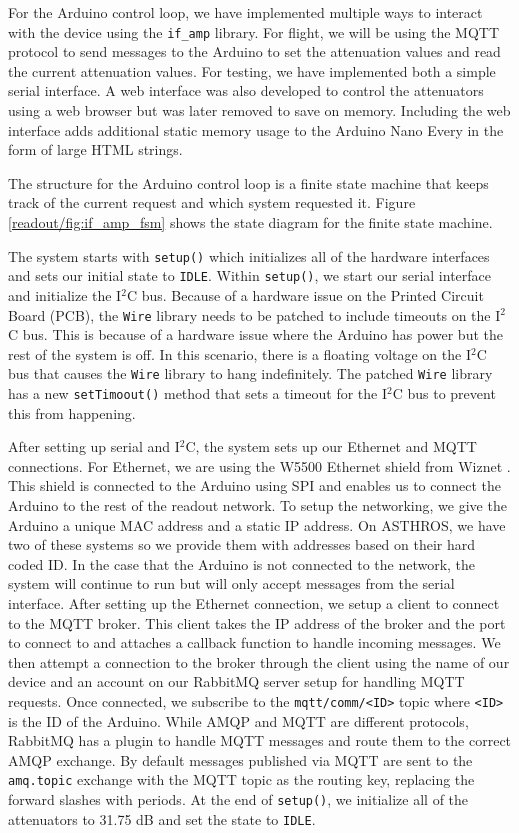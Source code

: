 For the Arduino control loop, we have implemented multiple ways to interact with the device using the \texttt{if\_amp} library.
For flight, we will be using the MQTT protocol to send messages to the Arduino to set the attenuation values and read the current attenuation values.
For testing, we have implemented both a simple serial interface. 
A web interface was also developed to control the attenuators using a web browser but was later removed to save on memory. 
Including the web interface adds additional static memory usage to the Arduino Nano Every in the form of large HTML strings.

The structure for the Arduino control loop is a finite state machine that keeps track of the current request and which system requested it.
Figure \ref{readout/fig:if_amp_fsm} shows the state diagram for the finite state machine.

The system starts with \texttt{setup()} which initializes all of the hardware interfaces and sets our initial state to \texttt{IDLE}.
Within \texttt{setup()}, we start our serial interface and initialize the I$^2$C bus.
Because of a hardware issue on the Printed Circuit Board (PCB), the \texttt{Wire} library needs to be patched to include timeouts on the I$^2$C bus.
This is because of a hardware issue where the Arduino has power but the rest of the system is off.
In this scenario, there is a floating voltage on the I$^2$C bus that causes the \texttt{Wire} library to hang indefinitely.
The patched \texttt{Wire} library has a new \texttt{setTimoout()} method that sets a timeout for the I$^2$C bus to prevent this from happening.

After setting up serial and I$^2$C, the system sets up our Ethernet and MQTT connections.
For Ethernet, we are using the W5500 Ethernet shield from Wiznet \parencite{w5500}.
This shield is connected to the Arduino using SPI and enables us to connect the Arduino to the rest of the readout network. 
To setup the networking, we give the Arduino a unique MAC address and a static IP address.
On ASTHROS, we have two of these systems so we provide them with addresses based on their hard coded ID. 
In the case that the Arduino is not connected to the network, the system will continue to run but will only accept messages from the serial interface.
After setting up the Ethernet connection, we setup a client to connect to the MQTT broker.
This client takes the IP address of the broker and the port to connect to and attaches a callback function to handle incoming messages.
We then attempt a connection to the broker through the client using the name of our device and an account on our RabbitMQ server setup for handling MQTT requests.
Once connected, we subscribe to the \texttt{mqtt/comm/<ID>} topic where \texttt{<ID>} is the ID of the Arduino.
While AMQP and MQTT are different protocols, RabbitMQ has a plugin to handle MQTT messages and route them to the correct AMQP exchange.
By default messages published via MQTT are sent to the \texttt{amq.topic} exchange with the MQTT topic as the routing key, replacing the forward slashes with periods.
At the end of \texttt{setup()}, we initialize all of the attenuators to 31.75 dB and set the state to \texttt{IDLE}.

